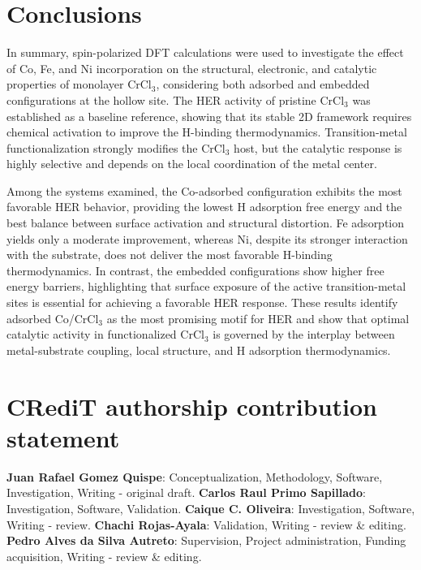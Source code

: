 \documentclass[a4paper,fleqn]{cas-dc}
\begin{document}
\section{Conclusions}

In summary, spin-polarized DFT calculations were used to investigate the effect of Co, Fe, and Ni incorporation on the structural, electronic, and catalytic properties of monolayer CrCl$_3$, considering both adsorbed and embedded configurations at the hollow site. %
The HER activity of pristine CrCl$_3$ was established as a baseline reference, showing that its stable 2D framework requires chemical activation to improve the H-binding thermodynamics. Transition-metal functionalization strongly modifies the CrCl$_3$ host, but the catalytic response is highly selective and depends on the local coordination of the metal center.

Among the systems examined, the Co-adsorbed configuration exhibits the most favorable HER behavior, providing the lowest H adsorption free energy and the best balance between surface activation and structural distortion. Fe adsorption yields only a moderate improvement, whereas Ni, despite its stronger interaction with the substrate, does not deliver the most favorable H-binding thermodynamics. %
In contrast, the embedded configurations show higher free energy barriers, highlighting that surface exposure of the active transition-metal sites is essential for achieving a favorable HER response.
These results identify adsorbed Co/CrCl$_3$ as the most promising motif for HER and show that optimal catalytic activity in functionalized CrCl$_3$ is governed by the interplay between metal-substrate coupling, local structure, and H adsorption thermodynamics.


\section*{CRediT authorship contribution statement}
\begin{sloppypar}
    \textbf{Juan Rafael Gomez Quispe}: Conceptualization, Methodology, Software, Investigation, Writing - original draft. \textbf{Carlos Raul Primo Sapillado}: Investigation, Software, Validation. \textbf{Caique C. Oliveira}: Investigation, Software, Writing - review. \textbf{Chachi Rojas-Ayala}: Validation, Writing - review \& editing. \textbf{Pedro Alves da Silva Autreto}: Supervision, Project administration, Funding acquisition, Writing - review \& editing.
\end{sloppypar}
\end{document}
